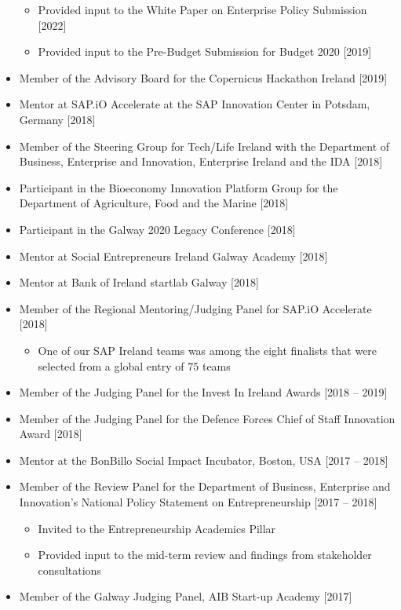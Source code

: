 \documentclass[10pt,a4paper]{res} %
\begin{document}
\begin{resume}
\begin{itemize}
\begin{itemize}
\begin{itemize}
\end{itemize}
\item Provided input to the White Paper on Enterprise Policy Submission [2022]
\item Provided input to the Pre-Budget Submission for Budget 2020 [2019]
\end{itemize}
\item Member of the Advisory Board for the Copernicus Hackathon Ireland [2019]
\item Mentor at SAP.iO Accelerate at the SAP Innovation Center in Potsdam, Germany [2018]
\item Member of the Steering Group for Tech/Life Ireland with the Department of Business, Enterprise and Innovation, Enterprise Ireland and the IDA [2018]
\item Participant in the Bioeconomy Innovation Platform Group for the Department of Agriculture, Food and the Marine [2018]
\item Participant in the Galway 2020 Legacy Conference [2018]
\item Mentor at Social Entrepreneurs Ireland Galway Academy [2018]
\item Mentor at Bank of Ireland startlab Galway [2018]
\item Member of the Regional Mentoring/Judging Panel for SAP.iO Accelerate [2018]
\begin{itemize} \itemsep -2pt
\item One of our SAP Ireland teams was among the eight finalists that were selected from a global entry of 75 teams
\end{itemize}
\item Member of the Judging Panel for the Invest In Ireland Awards [2018 -- 2019]
\item Member of the Judging Panel for the Defence Forces Chief of Staff Innovation Award [2018]
\item Mentor at the BonBillo Social Impact Incubator, Boston, USA [2017 -- 2018]
\item Member of the Review Panel for the Department of Business, Enterprise and Innovation's National Policy Statement on Entrepreneurship [2017 -- 2018]
\begin{itemize} \itemsep -2pt
\item Invited to the Entrepreneurship Academics Pillar
\item Provided input to the mid-term review and findings from stakeholder consultations
\end{itemize}
\item Member of the Galway Judging Panel, AIB Start-up Academy [2017]

\end{itemize}
\end{resume}
\end{document}

